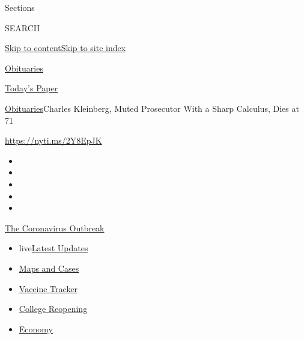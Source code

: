 Sections

SEARCH

\protect\hyperlink{site-content}{Skip to
content}\protect\hyperlink{site-index}{Skip to site index}

\href{https://www.nytimes.com/section/obituaries}{Obituaries}

\href{https://myaccount.nytimes.com/auth/login?response_type=cookie\&client_id=vi}{}

\href{https://www.nytimes.com/section/todayspaper}{Today's Paper}

\href{/section/obituaries}{Obituaries}\textbar{}Charles Kleinberg, Muted
Prosecutor With a Sharp Calculus, Dies at 71

\url{https://nyti.ms/2Y8EpJK}

\begin{itemize}
\item
\item
\item
\item
\item
\end{itemize}

\href{https://www.nytimes.com/news-event/coronavirus?action=click\&pgtype=Article\&state=default\&region=TOP_BANNER\&context=storylines_menu}{The
Coronavirus Outbreak}

\begin{itemize}
\tightlist
\item
  live\href{https://www.nytimes.com/2020/08/03/world/coronavirus-covid-19.html?action=click\&pgtype=Article\&state=default\&region=TOP_BANNER\&context=storylines_menu}{Latest
  Updates}
\item
  \href{https://www.nytimes.com/interactive/2020/us/coronavirus-us-cases.html?action=click\&pgtype=Article\&state=default\&region=TOP_BANNER\&context=storylines_menu}{Maps
  and Cases}
\item
  \href{https://www.nytimes.com/interactive/2020/science/coronavirus-vaccine-tracker.html?action=click\&pgtype=Article\&state=default\&region=TOP_BANNER\&context=storylines_menu}{Vaccine
  Tracker}
\item
  \href{https://www.nytimes.com/2020/08/02/us/covid-college-reopening.html?action=click\&pgtype=Article\&state=default\&region=TOP_BANNER\&context=storylines_menu}{College
  Reopening}
\item
  \href{https://www.nytimes.com/live/2020/08/03/business/stock-market-today-coronavirus?action=click\&pgtype=Article\&state=default\&region=TOP_BANNER\&context=storylines_menu}{Economy}
\end{itemize}

